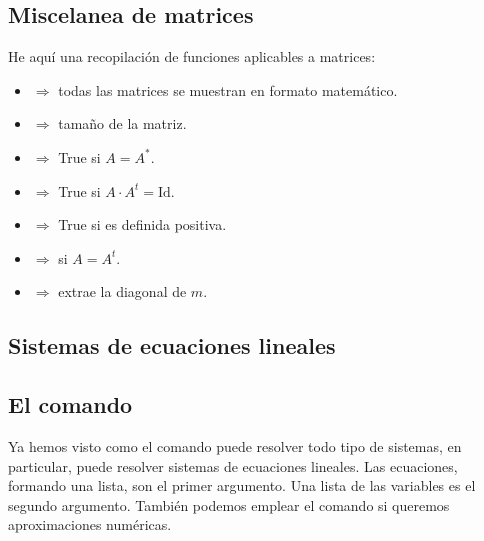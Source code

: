 \documentclass[a4paper,10pt, draft]{article}
\newcommand{\com}[1]{\textbf{\color{blue}{#1}}}
\newenvironment{capitulo}{\begin{tcolorbox}[colback=red!5!white,colframe=red!75!black]}{\end{tcolorbox}\bigskip}
\begin{document}
\subsection{Miscelanea de matrices}

He aquí una recopilación de funciones aplicables a matrices:

\begin{itemize}


\item \com{\$Post:=If[MatrixQ[\#], MatrixForm[\#],\#]\&} $\Rightarrow$  todas las matrices se muestran en formato matemático.

\item \com{Dimensions[m]} $\Rightarrow$ tamaño de la matriz.


\item \com{HermitianMatrixQ[m]} $\Rightarrow$ True si  $A=A^*$.

\item \com{OrthogonalMatrixQ[m]} $\Rightarrow$ True si $A\cdot A^t = \mathrm{Id}$.

\item \com{PositiveDefiniteMatrixQ[m]} $\Rightarrow$ True si es definida positiva.

\item \com{SymmetricMatrixQ[m]} $\Rightarrow$ si $A= A^t$.

\item \com{Diagonal[m]} $\Rightarrow$ extrae la diagonal de $m$.




\end{itemize}

\newpage

\begin{capitulo}

\section{Sistemas de ecuaciones lineales}

\end{capitulo}



\subsection{El comando \com{Solve}}



Ya hemos visto como el comando \com{Solve} puede resolver todo tipo de sistemas, en particular, puede resolver sistemas de ecuaciones lineales. Las ecuaciones, formando una lista, son el primer argumento. Una lista de las variables es el segundo argumento. También podemos emplear el comando \com{NSolve} si queremos aproximaciones numéricas.
\end{document}
